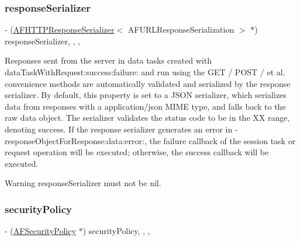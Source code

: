 \subsubsection{\texorpdfstring{response\+Serializer}{responseSerializer}}
{\footnotesize\ttfamily -\/ (\mbox{\hyperlink{interface_a_f_h_t_t_p_response_serializer}{A\+F\+H\+T\+T\+P\+Response\+Serializer}}$<$ A\+F\+U\+R\+L\+Response\+Serialization $>$ $\ast$) response\+Serializer\hspace{0.3cm}{\ttfamily [read]}, {\ttfamily [write]}, {\ttfamily [nonatomic]}, {\ttfamily [strong]}}

Responses sent from the server in data tasks created with {\ttfamily data\+Task\+With\+Request\+:success\+:failure\+:} and run using the {\ttfamily G\+ET} / {\ttfamily P\+O\+ST} / et al. convenience methods are automatically validated and serialized by the response serializer. By default, this property is set to a J\+S\+ON serializer, which serializes data from responses with a {\ttfamily application/json} M\+I\+ME type, and falls back to the raw data object. The serializer validates the status code to be in the {\+XX} range, denoting success. If the response serializer generates an error in {\ttfamily -\/response\+Object\+For\+Response\+:data\+:error\+:}, the {\ttfamily failure} callback of the session task or request operation will be executed; otherwise, the {\ttfamily success} callback will be executed.

\begin{DoxyWarning}{Warning}
{\ttfamily response\+Serializer} must not be {\ttfamily nil}. 
\end{DoxyWarning}
\mbox{\label{interface_a_f_h_t_t_p_request_operation_manager_aa8427c89d6b51ca23e2d00ddeeb8106f}} 
\subsubsection{\texorpdfstring{security\+Policy}{securityPolicy}}
{\footnotesize\ttfamily -\/ (\mbox{\hyperlink{interface_a_f_security_policy}{A\+F\+Security\+Policy}} $\ast$) security\+Policy\hspace{0.3cm}{\ttfamily [read]}, {\ttfamily [write]}, {\ttfamily [nonatomic]}, {\ttfamily [strong]}}

